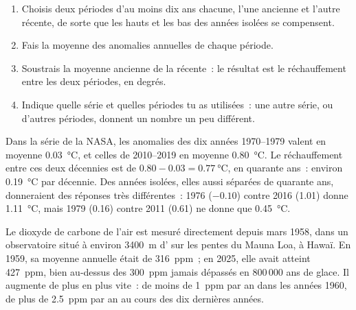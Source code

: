 \begin{method}
\begin{enumerate}
  \item Choisis deux périodes d'au moins dix ans chacune, l'une ancienne et
        l'autre récente, de sorte que les hauts et les bas des années
        isolées se compensent.
  \item Fais la moyenne des anomalies annuelles de chaque période.
  \item Soustrais la moyenne ancienne de la récente~: le résultat est le
        réchauffement entre les deux périodes, en degrés.
  \item Indique quelle série et quelles périodes tu as utilisées~: une
        autre série, ou d'autres périodes, donnent un nombre un peu
        différent.
\end{enumerate}
\end{method}

\begin{example}
Dans la série de la NASA, les anomalies des dix années 1970--1979 valent
en moyenne \qty{0.03}{\degreeCelsius}, et celles de 2010--2019 en moyenne
\qty{0.80}{\degreeCelsius}. Le réchauffement entre ces deux décennies est
de $0.80 - 0.03 = \qty{0.77}{\degreeCelsius}$, en quarante ans~: environ
\qty{0.19}{\degreeCelsius} par décennie. Des années isolées, elles aussi
séparées de quarante ans, donneraient des réponses très différentes~: 1976
($-0.10$) contre 2016 (1.01) donne \qty{1.11}{\degreeCelsius}, mais 1979
(0.16) contre 2011 (0.61) ne donne que \qty{0.45}{\degreeCelsius}.
\end{example}

Le dioxyde de carbone de l'air est mesuré directement depuis mars 1958,
dans un observatoire situé à environ \qty{3400}{m} d' sur les
pentes du  Mauna Loa, à Hawaï. En 1959, sa moyenne annuelle était
de \qty{316}{ppm}~; en 2025, elle avait atteint \qty{427}{ppm}, bien
au-dessus des \qty{300}{ppm} jamais dépassés en 800\,000 ans de glace. Il
augmente de plus en plus vite~: de moins de \qty{1}{ppm} par an dans les
années 1960, de plus de \qty{2.5}{ppm} par an au cours des dix dernières
années.

